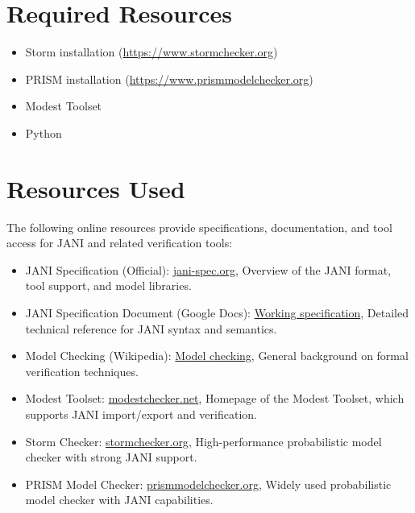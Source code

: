 \documentclass{report}
\begin{document}
\section*{Required Resources}

\begin{itemize}
    \item Storm installation (\url{https://www.stormchecker.org})
    \item PRISM installation (\url{https://www.prismmodelchecker.org})
    \item Modest Toolset
    \item Python
\end{itemize}

\section*{Resources Used}

The following online resources provide specifications, documentation, and tool access for JANI and related verification tools:

\begin{itemize}
    \item JANI Specification (Official): \href{https://jani-spec.org/}{jani-spec.org}, Overview of the JANI format, tool support, and model libraries.
    
    \item JANI Specification Document (Google Docs): \href{https://docs.google.com/document/d/1BDQIzPBtscxJFFlDUEPIo8ivKHgXT8_X6hz5quq7jK0/edit}{Working specification}, Detailed technical reference for JANI syntax and semantics.
    
    \item Model Checking (Wikipedia): \href{https://en.wikipedia.org/wiki/Model_checking}{Model checking}, General background on formal verification techniques.
    
    \item Modest Toolset: \href{https://www.modestchecker.net/}{modestchecker.net}, Homepage of the Modest Toolset, which supports JANI import/export and verification.
    
    \item Storm Checker: \href{https://www.stormchecker.org}{stormchecker.org}, High-performance probabilistic model checker with strong JANI support.
    
    \item PRISM Model Checker: \href{https://www.prismmodelchecker.org}{prismmodelchecker.org}, Widely used probabilistic model checker with JANI capabilities.
\end{itemize}
\end{document}
